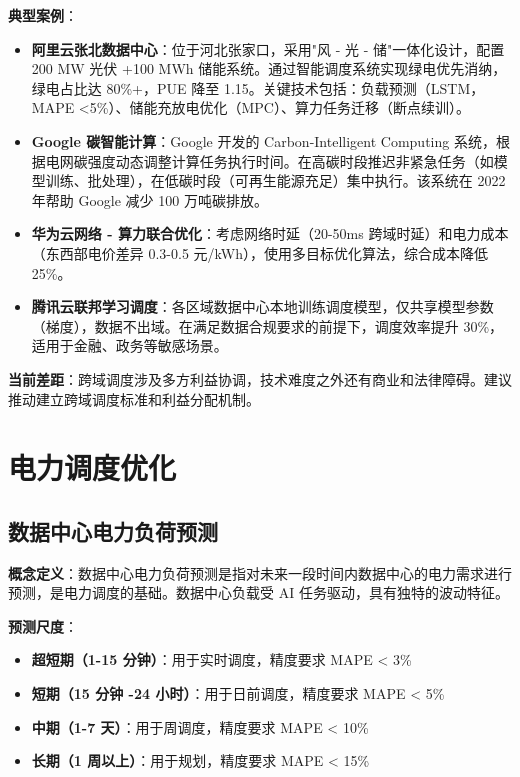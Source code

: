 \documentclass[12pt,a4paper]{article}
\begin{document}
\textbf{典型案例}：

\begin{itemize}
    \item \textbf{阿里云张北数据中心}：位于河北张家口，采用"风 - 光 - 储"一体化设计，配置 200 MW 光伏 +100 MWh 储能系统。通过智能调度系统实现绿电优先消纳，绿电占比达 80\%+，PUE 降至 1.15。关键技术包括：负载预测（LSTM，MAPE <5\%）、储能充放电优化（MPC）、算力任务迁移（断点续训）\cite{li2021zhangbei,chen2021sustainable,alibaba2022sustainability}。
    
    \item \textbf{Google 碳智能计算}：Google 开发的 Carbon-Intelligent Computing 系统，根据电网碳强度动态调整计算任务执行时间。在高碳时段推迟非紧急任务（如模型训练、批处理），在低碳时段（可再生能源充足）集中执行。该系统在 2022 年帮助 Google 减少 100 万吨碳排放\cite{hamilton2022energy,liu2021carbon,google2023sustainability}。
    
    \item \textbf{华为云网络 - 算力联合优化}：考虑网络时延（20-50ms 跨域时延）和电力成本（东西部电价差异 0.3-0.5 元/kWh），使用多目标优化算法，综合成本降低 25\%\cite{dong2022east}。
    
    \item \textbf{腾讯云联邦学习调度}：各区域数据中心本地训练调度模型，仅共享模型参数（梯度），数据不出域。在满足数据合规要求的前提下，调度效率提升 30\%，适用于金融、政务等敏感场景。
\end{itemize}

\textbf{当前差距}：跨域调度涉及多方利益协调，技术难度之外还有商业和法律障碍。建议推动建立跨域调度标准和利益分配机制。

\section{电力调度优化}
\label{sec:power}

\subsection{数据中心电力负荷预测}

\textbf{概念定义}：数据中心电力负荷预测是指对未来一段时间内数据中心的电力需求进行预测，是电力调度的基础。数据中心负载受 AI 任务驱动，具有独特的波动特征\cite{iea2023data}。

\textbf{预测尺度}：
\begin{itemize}
    \item \textbf{超短期（1-15 分钟）}：用于实时调度，精度要求 MAPE < 3\%
    \item \textbf{短期（15 分钟 -24 小时）}：用于日前调度，精度要求 MAPE < 5\%
    \item \textbf{中期（1-7 天）}：用于周调度，精度要求 MAPE < 10\%
    \item \textbf{长期（1 周以上）}：用于规划，精度要求 MAPE < 15\%
\end{itemize}
\end{document}
